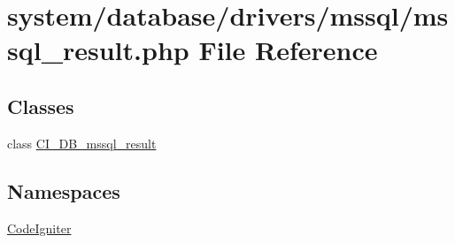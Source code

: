 \hypertarget{mssql__result_8php}{}\section{system/database/drivers/mssql/mssql\+\_\+result.php File Reference}
\label{mssql__result_8php}
\subsection*{Classes}
\begin{DoxyCompactItemize}
\item 
class \mbox{\hyperlink{class_c_i___d_b__mssql__result}{C\+I\+\_\+\+D\+B\+\_\+mssql\+\_\+result}}
\end{DoxyCompactItemize}
\subsection*{Namespaces}
\begin{DoxyCompactItemize}
\item 
 \mbox{\hyperlink{namespace_code_igniter}{Code\+Igniter}}
\end{DoxyCompactItemize}
